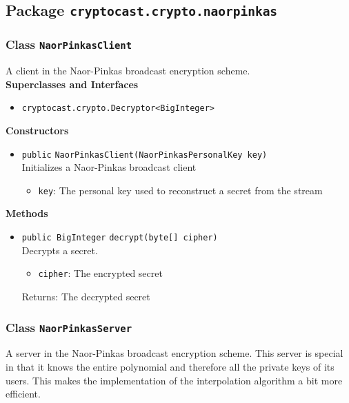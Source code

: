 \subsection{Package \lstinline!cryptocast.crypto.naorpinkas!}

\subsubsection{Class \lstinline|NaorPinkasClient|}
A client in the Naor-Pinkas broadcast encryption scheme. \\


\textbf{Superclasses and Interfaces}
\begin{itemize}
\item \lstinline|cryptocast.crypto.Decryptor<BigInteger>|
\end{itemize}



\textbf{Constructors}
\begin{itemize}
\item \lstinline|public| \lstinline|NaorPinkasClient|\lstinline|(NaorPinkasPersonalKey key)|\\
Initializes a Naor-Pinkas broadcast client
\begin{itemize}
\item \lstinline|key|: The personal key used to reconstruct a secret from the stream
\end{itemize}



\end{itemize}


\textbf{Methods}
\begin{itemize}
\item \lstinline|public BigInteger| \lstinline|decrypt|\lstinline|(byte[] cipher)|\\
Decrypts a secret.
\begin{itemize}
\item \lstinline|cipher|: The encrypted secret
\end{itemize}

Returns: The decrypted secret

\end{itemize}

\subsubsection{Class \lstinline|NaorPinkasServer|}
A server in the Naor-Pinkas broadcast encryption scheme. This server is special in that it knows
 the entire polynomial and therefore all the private keys of its users. This makes the implementation
 of the interpolation algorithm a bit more efficient. \\


